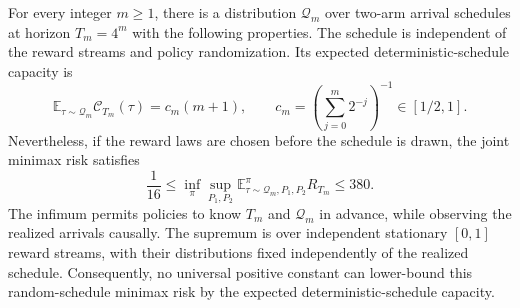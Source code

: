 \begin{theorem}
\label{thm:random-schedule-separation}
For every integer $m\ge1$, there is a distribution $\mathcal Q_m$ over
two-arm arrival schedules at horizon $T_m=4^m$ with the following
properties. The schedule is independent of the reward streams and
policy randomization. Its expected deterministic-schedule capacity is
\begin{equation}
 \mathbb E_{\tau\sim\mathcal Q_m}\mathscr C_{T_m}(\tau)
   =c_m(m+1),\qquad
 c_m=\left(\sum_{j=0}^m2^{-j}\right)^{-1}\in[1/2,1].
 \label{eq:expected-random-capacity}
\end{equation}
Nevertheless, if the reward laws are chosen before the schedule is
drawn, the joint minimax risk satisfies
\begin{equation}
 \frac1{16}\le
 \inf_{\pi}\sup_{P_1,P_2}
     \mathbb E_{\tau\sim\mathcal Q_m,P_1,P_2}^{\pi}R_{T_m}
 \le380.
 \label{eq:random-schedule-risk}
\end{equation}
The infimum permits policies to know $T_m$ and $\mathcal Q_m$ in
advance, while observing the realized arrivals causally. The
supremum is over independent stationary $[0,1]$ reward streams, with
their distributions fixed independently of the realized schedule.
Consequently, no universal positive constant can lower-bound this
random-schedule minimax risk by the expected deterministic-schedule
capacity.
\end{theorem}

